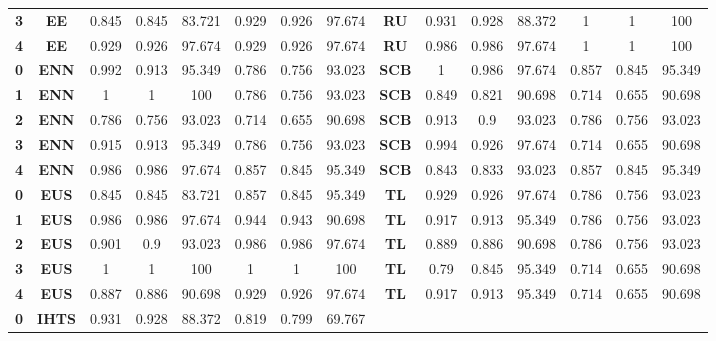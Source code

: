 {{\begin{tabular}{c|c|cccccc|ccccccc}
\textbf{3} & \textbf{EE} & 0.845 & 0.845 & 83.721 & 0.929 & 0.926 & 97.674 & \multicolumn{1}{c|}{\textbf{RU}} & 0.931 & 0.928 & 88.372 & 1     & 1     & 100 \\
\textbf{4} & \textbf{EE} & 0.929 & 0.926 & 97.674 & 0.929 & 0.926 & 97.674 & \multicolumn{1}{c|}{\textbf{RU}} & 0.986 & 0.986 & 97.674 & 1     & 1     & 100 \\
\textbf{0} & \textbf{ENN} & 0.992 & 0.913 & 95.349 & 0.786 & 0.756 & 93.023 & \multicolumn{1}{c|}{\textbf{SCB}} & 1     & 0.986 & 97.674 & 0.857 & 0.845 & 95.349 \\
\textbf{1} & \textbf{ENN} & 1     & 1     & 100   & 0.786 & 0.756 & 93.023 & \multicolumn{1}{c|}{\textbf{SCB}} & 0.849 & 0.821 & 90.698 & 0.714 & 0.655 & 90.698 \\
\textbf{2} & \textbf{ENN} & 0.786 & 0.756 & 93.023 & 0.714 & 0.655 & 90.698 & \multicolumn{1}{c|}{\textbf{SCB}} & 0.913 & 0.9   & 93.023 & 0.786 & 0.756 & 93.023 \\
\textbf{3} & \textbf{ENN} & 0.915 & 0.913 & 95.349 & 0.786 & 0.756 & 93.023 & \multicolumn{1}{c|}{\textbf{SCB}} & 0.994 & 0.926 & 97.674 & 0.714 & 0.655 & 90.698 \\
\textbf{4} & \textbf{ENN} & 0.986 & 0.986 & 97.674 & 0.857 & 0.845 & 95.349 & \multicolumn{1}{c|}{\textbf{SCB}} & 0.843 & 0.833 & 93.023 & 0.857 & 0.845 & 95.349 \\
\textbf{0} & \textbf{EUS} & 0.845 & 0.845 & 83.721 & 0.857 & 0.845 & 95.349 & \multicolumn{1}{c|}{\textbf{TL}} & 0.929 & 0.926 & 97.674 & 0.786 & 0.756 & 93.023 \\
\textbf{1} & \textbf{EUS} & 0.986 & 0.986 & 97.674 & 0.944 & 0.943 & 90.698 & \multicolumn{1}{c|}{\textbf{TL}} & 0.917 & 0.913 & 95.349 & 0.786 & 0.756 & 93.023 \\
\textbf{2} & \textbf{EUS} & 0.901 & 0.9   & 93.023 & 0.986 & 0.986 & 97.674 & \multicolumn{1}{c|}{\textbf{TL}} & 0.889 & 0.886 & 90.698 & 0.786 & 0.756 & 93.023 \\
\textbf{3} & \textbf{EUS} & 1     & 1     & 100   & 1     & 1     & 100   & \multicolumn{1}{c|}{\textbf{TL}} & 0.79  & 0.845 & 95.349 & 0.714 & 0.655 & 90.698 \\
\textbf{4} & \textbf{EUS} & 0.887 & 0.886 & 90.698 & 0.929 & 0.926 & 97.674 & \multicolumn{1}{c|}{\textbf{TL}} & 0.917 & 0.913 & 95.349 & 0.714 & 0.655 & 90.698 \\
\textbf{0} & \textbf{IHTS} & 0.931 & 0.928 & 88.372 & 0.819 & 0.799 & 69.767 &       &       &       &       &       &       &  \\

\end{tabular}}}
